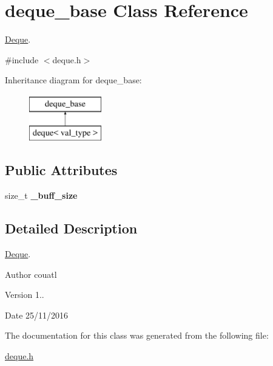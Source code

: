 \hypertarget{classdeque__base}{}\section{deque\+\_\+base Class Reference}
\label{classdeque__base}


\hyperlink{class_deque}{Deque}.  




{\ttfamily \#include $<$deque.\+h$>$}

Inheritance diagram for deque\+\_\+base\+:\begin{figure}[H]
\begin{center}
\leavevmode
\includegraphics[height=2.000000cm]{classdeque__base}
\end{center}
\end{figure}
\subsection*{Public Attributes}
\begin{DoxyCompactItemize}
\item 
\hypertarget{classdeque__base_ad4e51927d21a0b41a078f8dd92f54895}{}\label{classdeque__base_ad4e51927d21a0b41a078f8dd92f54895} 
size\+\_\+t {\bfseries \+\_\+buff\+\_\+size}
\end{DoxyCompactItemize}


\subsection{Detailed Description}
\hyperlink{class_deque}{Deque}. 

\begin{DoxyAuthor}{Author}
couatl 
\end{DoxyAuthor}
\begin{DoxyVersion}{Version}
1.. 
\end{DoxyVersion}
\begin{DoxyDate}{Date}
25/11/2016 
\end{DoxyDate}


The documentation for this class was generated from the following file\+:\begin{DoxyCompactItemize}
\item 
\hyperlink{deque_8h}{deque.\+h}\end{DoxyCompactItemize}
